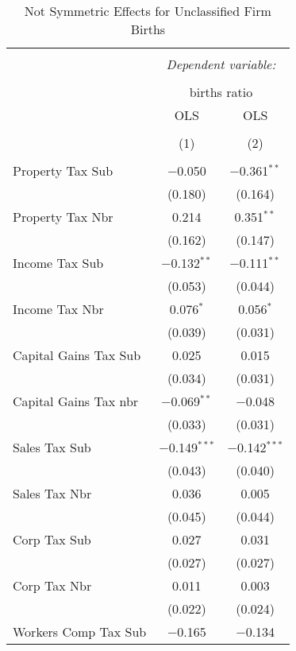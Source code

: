 
\begin{table}[!htbp] \centering 
  \caption{Not Symmetric Effects for  Unclassified Firm Births} 
  \label{99noequality} 
\footnotesize 
\begin{tabular}{@{\extracolsep{5pt}}lcc} 
\\[-1.8ex]\hline 
\hline \\[-1.8ex] 
 & \multicolumn{2}{c}{\textit{Dependent variable:}} \\ 
\cline{2-3} 
\\[-1.8ex] & \multicolumn{2}{c}{births ratio} \\ 
 & OLS & OLS \\ 
\\[-1.8ex] & (1) & (2)\\ 
\hline \\[-1.8ex] 
 Property Tax Sub & $-$0.050 & $-$0.361$^{**}$ \\ 
  & (0.180) & (0.164) \\ 
  Property Tax Nbr & 0.214 & 0.351$^{**}$ \\ 
  & (0.162) & (0.147) \\ 
  Income Tax Sub & $-$0.132$^{**}$ & $-$0.111$^{**}$ \\ 
  & (0.053) & (0.044) \\ 
  Income Tax Nbr & 0.076$^{*}$ & 0.056$^{*}$ \\ 
  & (0.039) & (0.031) \\ 
  Capital Gains Tax Sub & 0.025 & 0.015 \\ 
  & (0.034) & (0.031) \\ 
  Capital Gains Tax nbr & $-$0.069$^{**}$ & $-$0.048 \\ 
  & (0.033) & (0.031) \\ 
  Sales Tax Sub & $-$0.149$^{***}$ & $-$0.142$^{***}$ \\ 
  & (0.043) & (0.040) \\ 
  Sales Tax Nbr & 0.036 & 0.005 \\ 
  & (0.045) & (0.044) \\ 
  Corp Tax Sub & 0.027 & 0.031 \\ 
  & (0.027) & (0.027) \\ 
  Corp Tax Nbr & 0.011 & 0.003 \\ 
  & (0.022) & (0.024) \\ 
  Workers Comp Tax Sub & $-$0.165 & $-$0.134 \\ 

\end{tabular}
\end{table}
